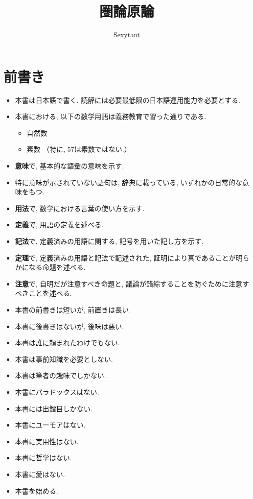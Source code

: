 \documentclass[dvipdfmx]{jsbook}
\title{圏論原論}
\author{Sexytant}
\theoremstyle{plain}
\begin{document}
\setcounter{tocdepth}{2}
\maketitle
\cleardoublepage
\setcounter{page}{0}\pagestyle{plain}
\chapter*{前書き}
\begin{itemize}
\item 本書は日本語で書く. 読解には必要最低限の日本語運用能力を必要とする.
\item
本書における, 以下の数学用語は義務教育で習った通りである.
\begin{itemize}
\item 自然数
\item 素数 （特に, 57は素数ではない.）
\end{itemize}
\item
{\bf 意味}で, 基本的な語彙の意味を示す. 
\item 特に意味が示されていない語句は, 辞典に載っている, いずれかの日常的な意味をもつ.
\item
{\bf 用法}で, 数学における言葉の使い方を示す.
\item {\bf 定義}で, 用語の定義を述べる.
\item {\bf 記法}で, 定義済みの用語に関する, 記号を用いた記し方を示す.
\item {\bf 定理}で, 定義済みの用語と記法で記述された, 証明により真であることが明らかになる命題を述べる.
\item {\bf 注意}で, 自明だが注意すべき命題と, 議論が錯綜することを防ぐために注意すべきことを述べる.
\end{itemize}
\begin{itemize}
\item 本書の前書きは短いが, 前置きは長い.
\item 本書に後書きはないが, 後味は悪い.
\item 本書は誰に頼まれたわけでもない.
\item 本書は事前知識を必要としない.
\item 本書は筆者の趣味でしかない.
\item 本書にパラドックスはない.
\item 本書には出鱈目しかない.
\item 本書にユーモアはない.
\item 本書に実用性はない.
\item 本書に哲学はない.
\item 本書に愛はない.
\item 本書を始める.
\end{itemize}
\tableofcontents
\newpage
\setcounter{page}{0}
\end{document}
